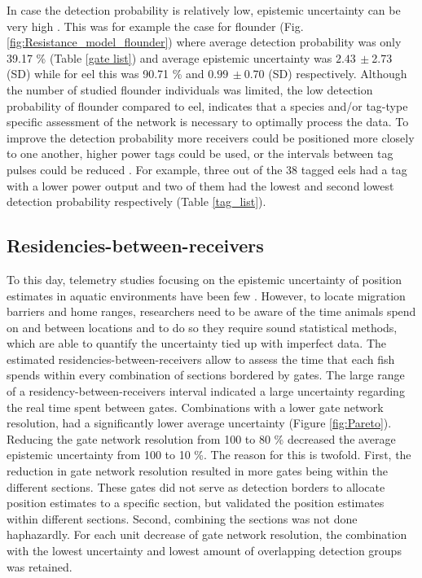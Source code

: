 \documentclass[preprint,12pt,authoryear]{elsarticle}
\begin{document}
\begin{spacing}{1.9}
In case the detection probability is relatively low, epistemic uncertainty can be very high \citep{Melnychuk2012}. This was for example the case for flounder (Fig. \ref{fig:Resistance_model_flounder}) where average detection probability was only 39.17 \% (Table \ref{gate list}) and average epistemic uncertainty was $2.43\,\pm $2.73 (SD) while for eel this was 90.71 \% and $0.99\,\pm $0.70 (SD) respectively. Although the number of studied flounder individuals was limited, the low detection probability of flounder compared to eel, indicates that a species and/or tag-type specific assessment of the network is necessary to optimally process the data. To improve the detection probability more receivers could be positioned more closely to one another, higher power tags could be used, or the intervals between tag pulses could be reduced \citep{Clements2005}. For example, three out of the 38 tagged eels had a tag with a lower power output and two of them had the lowest and second lowest detection probability respectively (Table \ref{tag_list}).

\subsection{Residencies-between-receivers}
 
To this day, telemetry studies focusing on the epistemic uncertainty of position estimates in aquatic environments have been few \citep{Pedersen2013,Roy2017,Steckenreuter2017}. However, to locate migration barriers and home ranges, researchers need to be aware of the time animals spend on and between locations and to do so they require sound statistical methods, which are able to quantify the uncertainty tied up with imperfect data. The estimated residencies-between-receivers allow to assess the time that each fish spends within every combination of sections bordered by gates. The large range of a residency-between-receivers interval indicated a large uncertainty regarding the real time spent between gates. Combinations with a lower gate network resolution, had a significantly lower average uncertainty (Figure \ref{fig:Pareto}). Reducing the gate network resolution from 100 to  80 \% decreased the average epistemic uncertainty from 100 to 10 \%. The reason for this is twofold. First, the reduction in gate network resolution resulted in more gates being within the different sections. These gates did not serve as detection borders to allocate position estimates to a specific section, but validated the position estimates within different sections. Second, combining the sections was not done haphazardly. For each unit decrease of gate network resolution, the combination with the lowest uncertainty and lowest amount of overlapping detection groups was retained. 


\end{spacing}
\end{document}
